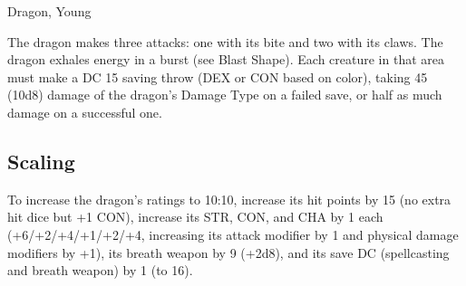\begin{DndMonster}[float*=b, width=\textwidth + 8pt]{Dragon, Young}
\begin{multicols}{2}
 The dragon makes three attacks: one with its bite and two with its claws.
\DndMonsterAttack[
	name=Bite,
	distance=melee,
	type=weapon,
	mod=+8,
	reach=10,
	dmg=\DndDice{2d10 + 5},
	dmg-type=piercing,
	extra={ plus 4 (1d8) damage of the dragon's Damage Type.}
]
\DndMonsterAttack[
	name=Claw,
	distance=melee,
	type=weapon,
	mod=+8,
	reach=5,
	dmg=\DndDice{2d6 + 5},
	dmg-type=slashing
]
The dragon exhales energy in a burst (see Blast Shape). Each creature in that area must make a DC 15 saving throw (DEX or CON based on color), taking 45 (10d8) damage of the dragon's Damage Type on a failed save, or half as much damage on a successful one.
\subsection{Scaling}
To increase the dragon's ratings to 10:10, increase its hit points by 15 (no extra hit dice but +1 CON), increase its STR, CON, and CHA by 1 each (+6/+2/+4/+1/+2/+4, increasing its attack modifier by 1 and physical damage modifiers by +1), its breath weapon by 9 (+2d8), and its save DC (spellcasting and breath weapon) by 1 (to 16).
\end{multicols}
\end{DndMonster}

